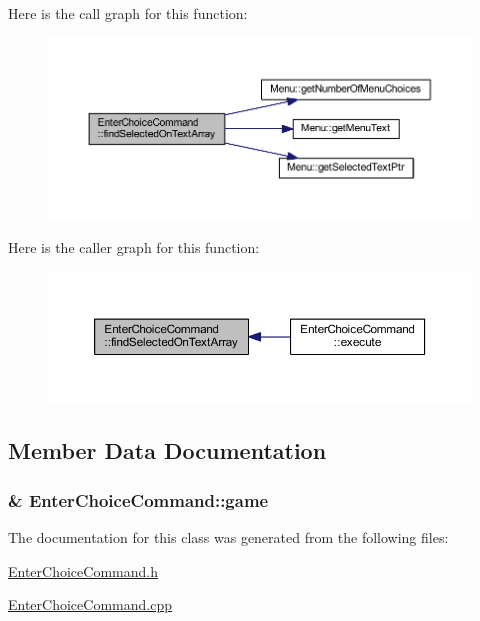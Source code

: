 Here is the call graph for this function\+:
\nopagebreak
\begin{figure}[H]
\begin{center}
\leavevmode
\includegraphics[width=350pt]{class_enter_choice_command_a09b35eafcb1ba6d9e6fb93425702e6c4_cgraph}
\end{center}
\end{figure}




Here is the caller graph for this function\+:
\nopagebreak
\begin{figure}[H]
\begin{center}
\leavevmode
\includegraphics[width=350pt]{class_enter_choice_command_a09b35eafcb1ba6d9e6fb93425702e6c4_icgraph}
\end{center}
\end{figure}




\subsection{Member Data Documentation}
\hypertarget{class_enter_choice_command_a53c2b9d8c1ee8b9bdbed6ad4889f10b0}{}
\subsubsection[{game}]{\& Enter\+Choice\+Command\+::game\hspace{0.3cm}{\ttfamily [protected]}}\label{class_enter_choice_command_a53c2b9d8c1ee8b9bdbed6ad4889f10b0}


The documentation for this class was generated from the following files\+:\begin{DoxyCompactItemize}
\item 
\hyperlink{_enter_choice_command_8h}{Enter\+Choice\+Command.\+h}\item 
\hyperlink{_enter_choice_command_8cpp}{Enter\+Choice\+Command.\+cpp}\end{DoxyCompactItemize}

